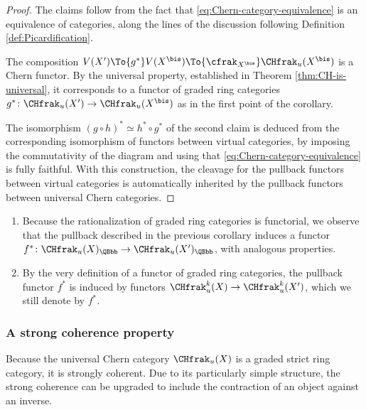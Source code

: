 \begin{proof}
The claims follow from the fact that \eqref{eq:Chern-category-equivalence} is an equivalence of categories, along the lines of the discussion following Definition \ref{def:Picardification}.

The composition $V(X^{\prime})\To{g^{\ast}} V(X^{\bis})\To{\cfrak_{X^{\bis}}}\CHfrak_{u}(X^{\bis})$ is a Chern functor. By the universal property, established in Theorem \ref{thm:CH-is-universal}, it corresponds to a functor of graded ring categories $g^\ast \colon \CHfrak_{u}(X^{\prime}) \to \CHfrak_{u}(X^{\bis})$ as in the first point of the corollary.

The isomorphism $(g\circ h)^{\ast}\simeq h^{\ast}\circ g^{\ast}$ of the second claim is deduced from the corresponding isomorphism of functors between virtual categories, by imposing the commutativity of the diagram and using that \eqref{eq:Chern-category-equivalence} is fully faithful. With this construction, the cleavage for the pullback functors between virtual categories is automatically inherited by the pullback functors between universal Chern categories.
\end{proof}

\skpt
\begin{remark}
\begin{enumerate}\label{rem:pullback-chern}
\item Because the rationalization of graded ring categories is functorial, we observe that the pullback described in the previous corollary induces a functor $f^{\ast}\colon\CHfrak_{u}(X)_{\QBbb}\to\CHfrak_{u}(X^{\prime})_{\QBbb}$, with analogous properties.
\item By the very definition of a functor of graded ring categories, the pullback functor $f^{\ast}$ is induced by functors $\CHfrak^{k}_{u}(X)\to \CHfrak_{u}^{k}(X^{\prime})$, which we still denote by $f^{\ast}$.
\end{enumerate}
\end{remark}

\subsubsection{A strong coherence property}\label{subsubsec:coherence-property}
Because the universal Chern category $\CHfrak_{u}(X)$ is a graded strict ring category, it is strongly coherent. Due to its particularly simple structure, the strong coherence can be upgraded to include the contraction of an object against an inverse.

